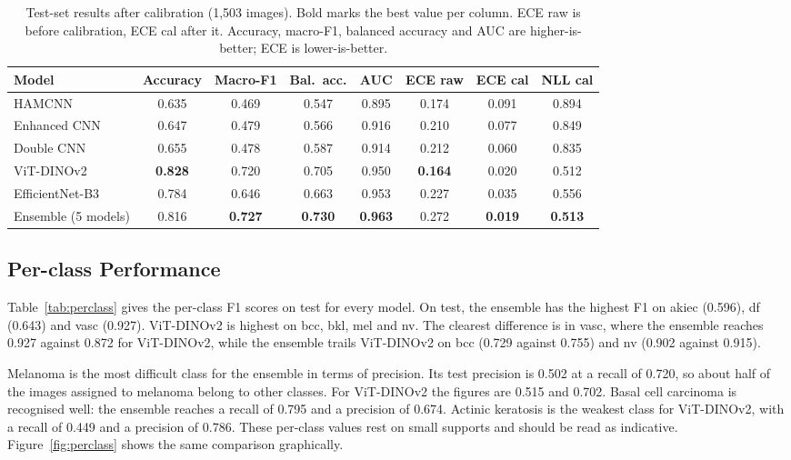 \documentclass[10pt,twocolumn]{article}
\begin{document}
\begin{table}[t]
\centering
\small
\caption{Test-set results after calibration (1,503 images). Bold marks the best value per column. ECE raw is before calibration, ECE cal after it. Accuracy, macro-F1, balanced accuracy and AUC are higher-is-better; ECE is lower-is-better.}
\label{tab:results}
\begin{tabular}{lccccccc}
\toprule
\textbf{Model} & \textbf{Accuracy} & \textbf{Macro-F1} & \textbf{Bal.\ acc.} & \textbf{AUC} & \textbf{ECE raw} & \textbf{ECE cal} & \textbf{NLL cal} \\
\midrule
HAMCNN          & 0.635 & 0.469 & 0.547 & 0.895 & 0.174 & 0.091 & 0.894 \\
Enhanced CNN    & 0.647 & 0.479 & 0.566 & 0.916 & 0.210 & 0.077 & 0.849 \\
Double CNN      & 0.655 & 0.478 & 0.587 & 0.914 & 0.212 & 0.060 & 0.835 \\
ViT-DINOv2      & \textbf{0.828} & 0.720 & 0.705 & 0.950 & \textbf{0.164} & 0.020 & 0.512 \\
EfficientNet-B3 & 0.784 & 0.646 & 0.663 & 0.953 & 0.227 & 0.035 & 0.556 \\
\midrule
Ensemble (5 models) & 0.816 & \textbf{0.727} & \textbf{0.730} & \textbf{0.963} & 0.272 & \textbf{0.019} & \textbf{0.513} \\
\bottomrule
\end{tabular}
\end{table}

\subsection{Per-class Performance}
Table~\ref{tab:perclass} gives the per-class F1 scores on test for every model. On test, the ensemble has the highest F1 on akiec (0.596), df (0.643) and vasc (0.927). ViT-DINOv2 is highest on bcc, bkl, mel and nv. The clearest difference is in vasc, where the ensemble reaches 0.927 against 0.872 for ViT-DINOv2, while the ensemble trails ViT-DINOv2 on bcc (0.729 against 0.755) and nv (0.902 against 0.915).

Melanoma is the most difficult class for the ensemble in terms of precision. Its test precision is 0.502 at a recall of 0.720, so about half of the images assigned to melanoma belong to other classes. For ViT-DINOv2 the figures are 0.515 and 0.702. Basal cell carcinoma is recognised well: the ensemble reaches a recall of 0.795 and a precision of 0.674. Actinic keratosis is the weakest class for ViT-DINOv2, with a recall of 0.449 and a precision of 0.786. These per-class values rest on small supports and should be read as indicative. Figure~\ref{fig:perclass} shows the same comparison graphically.
\end{document}
